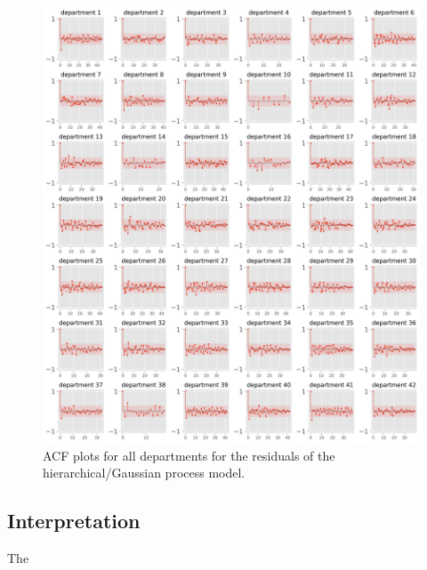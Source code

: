 \documentclass[paper=a4, fontsize=11pt]{scrartcl}
\begin{document}
\begin{figure}[!htb]\label{autocorr_after}
\centering
\includegraphics[width=1\textwidth]{acf_plots_after.png}
\caption{ACF plots for all departments for the residuals of the hierarchical/Gaussian process model.}
\end{figure}



\subsection{Interpretation}
The 


 

\end{document}
